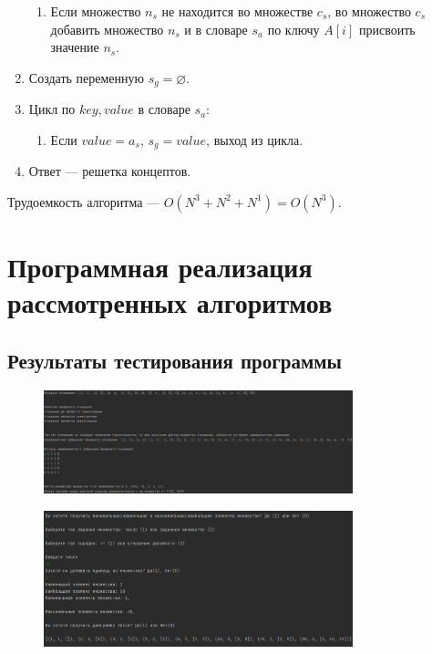 \documentclass[bachelor, och, labwork]{shiza}
\begin{document}
\begin{enumerate}
\begin{enumerate}
            \item Если множество $n_s$ не находится во множестве $c_s$, во множество $c_s$ добавить множество $n_s$
                  и в словаре $s_a$ по ключу $A[i]$ присвоить значение $n_s$.
        \end{enumerate}
    \item Создать переменную $s_g =\varnothing$.
    \item Цикл по $key,value$ в словаре $s_a$:
        \begin{enumerate} \item Если $value=a_s$, $s_g = value$, выход из цикла.\end{enumerate}
    \item Ответ --- решетка концептов.
\end{enumerate}
Трудоемкость алгоритма --- $O(N^3 + N^2 + N^1) = O(N^3)$.

\section{Программная реализация рассмотренных алгоритмов}
    
    \subsection{Результаты тестирования программы}

        \begin{figure}[H]
            \centering
            \includegraphics[width=0.8\textwidth]{pic/1.png}
            \caption{}
        \end{figure}

        
        \begin{figure}[H]
            \centering
            \includegraphics[width=0.8\textwidth]{pic/2.png}
            \caption{}
        \end{figure}
\end{document}
